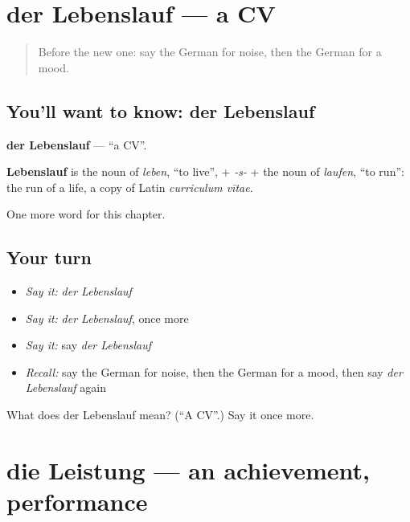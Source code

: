 \section[der Lebenslauf]{der Lebenslauf — a CV}

\label{lesson:GE-C233-lebenslauf}



\begin{quote}
Before the new one: say the German for noise, then the German for a mood.
\end{quote}

\subsection*{You'll want to know: der Lebenslauf}
\textbf{der Lebenslauf} — \textquotedblleft{}a CV\textquotedblright{}.

\begin{cousinweb}
\textbf{Lebenslauf} is the noun of \emph{leben}, \textquotedblleft{}to live\textquotedblright{}, + \emph{-s-} + the noun of \emph{laufen}, \textquotedblleft{}to run\textquotedblright{}: the run of a life, a copy of Latin \emph{curriculum vītae}.
\end{cousinweb}

\begin{grammarlens}[title={What you've built}]
One more word for this chapter.
\end{grammarlens}

\subsection*{Your turn}
\begin{itemize}
\raggedright
  \item \emph{Say it:} \emph{der Lebenslauf}
  \item \emph{Say it:} \emph{der Lebenslauf}, once more
  \item \emph{Say it:} say \emph{der Lebenslauf}
  \item \emph{Recall:} say the German for noise, then the German for a mood, then say \emph{der Lebenslauf} again
\end{itemize}

\begin{tcolorbox}[breakable,colback=teal!4,colframe=teal!35!black,title={Before you move on}]
What does der Lebenslauf mean? (\textquotedblleft{}A CV\textquotedblright{}.) Say it once more.
\end{tcolorbox}
\section[die Leistung]{die Leistung — an achievement, performance}

